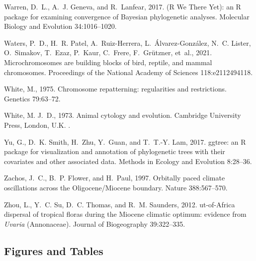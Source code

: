 \documentclass[a4paper, 12pt]{article}
\begin{document}
\begin{thebibliography}{73}
Warren, D.~L., A.~J. Geneva, and R.~Lanfear, 2017.
 ({R} {W}e {T}here {Y}et): an {R} package for examining
  convergence of {B}ayesian phylogenetic analyses.
\newblock Molecular Biology and Evolution 34:1016--1020.

Waters, P.~D., H.~R. Patel, A.~Ruiz-Herrera, L.~{\'A}lvarez-Gonz{\'a}lez, N.~C.
  Lister, O.~Simakov, T.~Ezaz, P.~Kaur, C.~Frere, F.~Gr{\"u}tzner, et~al.,
  2021.
\newblock Microchromosomes are building blocks of bird, reptile, and mammal
  chromosomes.
\newblock Proceedings of the National Academy of Sciences 118:e2112494118.

White, M., 1975.
\newblock Chromosome repatterning: regularities and restrictions.
\newblock Genetics 79:63--72.

White, M. J.~D., 1973.
\newblock Animal cytology and evolution.
\newblock Cambridge University Press, London, U.K. .

Yu, G., D.~K. Smith, H.~Zhu, Y.~Guan, and T.~T.-Y. Lam, 2017.
\newblock ggtree: an {R} package for visualization and annotation of
  phylogenetic trees with their covariates and other associated data.
\newblock Methods in Ecology and Evolution 8:28--36.

Zachos, J.~C., B.~P. Flower, and H.~Paul, 1997.
\newblock Orbitally paced climate oscillations across the {O}ligocene/{M}iocene
  boundary.
\newblock Nature 388:567--570.

Zhou, L., Y.~C. Su, D.~C. Thomas, and R.~M. Saunders, 2012.
ut-of-{A}frica dispersal of tropical floras during the {M}iocene
  climatic optimum: evidence from \textit{{U}varia} ({A}nnonaceae).
\newblock Journal of Biogeography 39:322--335.

\end{thebibliography}


\newpage
\begin{landscape}
\section{Figures and Tables}



\end{landscape}
\end{document}
